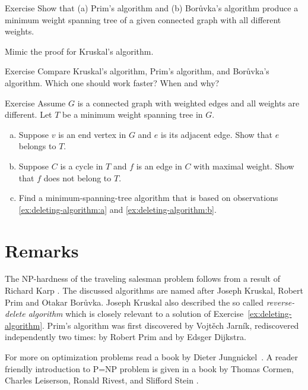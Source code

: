 \begin{thm}{Exercise}
Show that (a) Prim's algorithm and (b) Borůvka's algorithm produce a minimum weight spanning tree of a given connected graph with all different weights.
\end{thm}

 Mimic the proof for Kruskal’s algorithm.

\begin{thm}{Exercise}
Compare Kruskal’s algorithm, Prim's algorithm, and Borůvka's algorithm.
Which one should work faster?
When and why?
\end{thm}

\begin{thm}{Exercise}\label{ex:deleting-algorithm}
Assume $G$ is a connected graph with weighted edges and all weights are different.
Let $T$ be a minimum weight spanning tree in $G$.
\begin{enumerate}[(a)]
\item\label{ex:deleting-algorithm:a} Suppose $v$ is an end vertex in $G$ and $e$ is its adjacent edge.
Show that $e$ belongs to $T$.
\item\label{ex:deleting-algorithm:b} Suppose $C$ is a cycle in $T$ and $f$ is an edge in $C$ with maximal weight.
Show that $f$ does not belong to $T$.
\item Find a minimum-spanning-tree algorithm that is based on observations \ref{ex:deleting-algorithm:a} and \ref{ex:deleting-algorithm:b}.
\end{enumerate}
\end{thm}

\section*{Remarks}

The NP-hardness of the traveling salesman problem follows from a result of Richard Karp \cite{karp}.
The discussed algorithms are named after Joseph Kruskal, Robert Prim and Otakar Borůvka.
Joseph Kruskal also described the so called \emph{reverse-delete algorithm} \cite{kruskal} which is closely relevant to a solution of Exercise~\ref{ex:deleting-algorithm}.
Prim's algorithm was first discovered by Vojtěch Jarník,
rediscovered  independently two times: by Robert Prim and by Edsger Dijkstra.

For more on optimization problems read a book by Dieter Jungnickel~\cite{jungnickel}.
A reader friendly introduction to P=NP problem is given in a book by 
Thomas Cormen,
Charles Leiserson,
Ronald Rivest, and
Slifford Stein \cite[Chapter 34]{cormen-leiserson-rivest-stein}.


